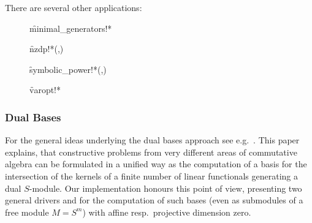 There are several other applications:
\begin{description}

\item[]
  \begin{syntax}
    \f{minimal\_generators!*} 
  \end{syntax}
  \hypertarget{procedure:MINIMAL_GENERATORS!*}{}

\item[]
  \begin{syntax}
    \f{nzdp!*}(,)
  \end{syntax}
  \hypertarget{procedure:NZDP!*}{}

\item[]
  \begin{syntax}
    \f{symbolic\_power!*}(,)
  \end{syntax}
  \hypertarget{procedure:SYMBOLIC_POWER!*}{}

\item[]
  \begin{syntax}
    \f{varopt!*} 
  \end{syntax}
  \hypertarget{procedure:VAROPT!*}{}
\end{description}


\subsubsection{Dual Bases}


For the general ideas underlying the dual bases approach see e.g.\
\cite{Marinari:91}. This paper explains, that constructive problems from very
different areas of commutative algebra can be formulated in a unified
way as the computation of a basis for the intersection of the kernels
of a finite number of linear functionals generating a dual
$S$-module. Our implementation honours
this point of view, presenting two general drivers  and
\ind{dualhbases} for the computation of such bases (even as submodules
of a free module $M=S^m$) with affine resp.\ projective dimension zero.

